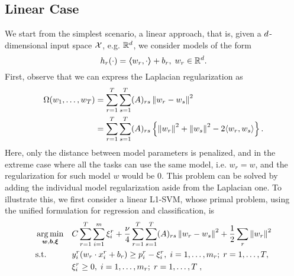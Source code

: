 \subsection{Linear Case}
We start from the simplest scenario, a linear approach, that is, given a $d$-dimensional input space $\mathcal{X}$, e.g. $\mathbb{R}^d$, we consider models of the form
$$ h_r(\cdot) = \bm{\left\langle} w_r, \cdot \bm{\right\rangle} + b_r,\;  w_r \in \mathbb{R}^d .$$
First, observe that we can express the Laplacian regularization as
\begin{equation}
    \nonumber
    \begin{aligned}
        \Omega(w_1, \ldots, w_T) &= \sum_{r=1}^T \sum_{s=1}^T (A)_{rs} \left\lVert w_r - w_s\right\rVert^2 \\
        &=  \sum_{r=1}^T \sum_{s=1}^T (A)_{rs} \left\{ \left\lVert w_r\right\rVert^2 + \left\lVert w_s\right\rVert^2 - 2 \langle w_r, w_s \rangle \right\}.
    \end{aligned}
\end{equation}
Here, only the distance between model parameters is penalized, and in the extreme case where all the tasks can use the same model, i.e. $w_r = w$, and the regularization for such model $w$ would be $0$.
This problem can be solved by adding the individual model regularization aside from the Laplacian one.
To illustrate this, we first consider a linear L1-SVM, whose primal problem, using the unified formulation for regression and classification, is
\begin{equation}\label{eq:linear_gl_primal}
    \begin{aligned}
         & \argmin_{\fv{w}, \fv{b}, \fv{\xi}}
         &                                    & {C \sum_{r=1}^T \sum_{i=1}^m{\xi_{i}^r} + \frac{\nu}{4} \sum_{r=1}^T \sum_{s=1}^T (A)_{rs} \norm{w_r - w_s}^2 + \frac{1}{2} \sum_r \norm{w_r}^2 }                                                               \\
         & \text{s.t.}
         &                                    & y_{i}^r ( w_r \cdot x_{i}^r + b_r) \geq p_{i}^r - \xi_{i}^r , \;  i=1,\ldots,m_r; \;  r=1,\ldots,T,                                                                                                           \\
         &                                    &                                                                                                                                                 & \xi_{i}^r \geq 0, \;  i=1,\ldots,m_r; \;  r=1,\ldots,T \; ,
    \end{aligned}
\end{equation}
